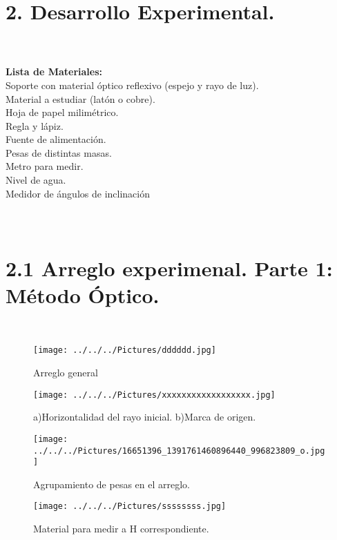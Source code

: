 \documentclass[10pt,a4paper]{article}
\begin{document}
\section*{2.  Desarrollo Experimental.}\\

 \\
\textbf{Lista de Materiales:} \\
Soporte con material \'{o}ptico reflexivo (espejo y rayo de luz).\\
Material a estudiar (lat\'{o}n o cobre). \\
Hoja de papel milim\'{e}trico. \\
Regla y l\'{a}piz. \\
Fuente de alimentaci\'{o}n.\\
Pesas de distintas masas. \\
Metro para medir. \\
Nivel de agua. \\
Medidor de \'{a}ngulos de inclinaci\'{o}n \\
\\
\\
\section*{2.1 Arreglo experimenal. Parte 1: M\'{e}todo \'{O}ptico.} \\

\begin{figure}[hbtp]
\centering
\texttt{[image: ../../../Pictures/dddddd.jpg]} 
\caption{Arreglo general}
\end{figure}

\begin{figure}[hbtp]
\centering
\texttt{[image: ../../../Pictures/xxxxxxxxxxxxxxxxxx.jpg]} 
\caption{a)Horizontalidad del rayo inicial.  b)Marca de origen. }
\end{figure}

\begin{figure}[hbtp]
\centering
\texttt{[image: ../../../Pictures/16651396\_1391761460896440\_996823809\_o.jpg]} 
\caption{Agrupamiento de pesas en el arreglo.}
\end{figure}

\begin{figure}[hbtp]
\centering
\texttt{[image: ../../../Pictures/ssssssss.jpg]} 
\caption{Material para medir a H correspondiente.}
\end{figure}
\pagebreak 
\end{document}
